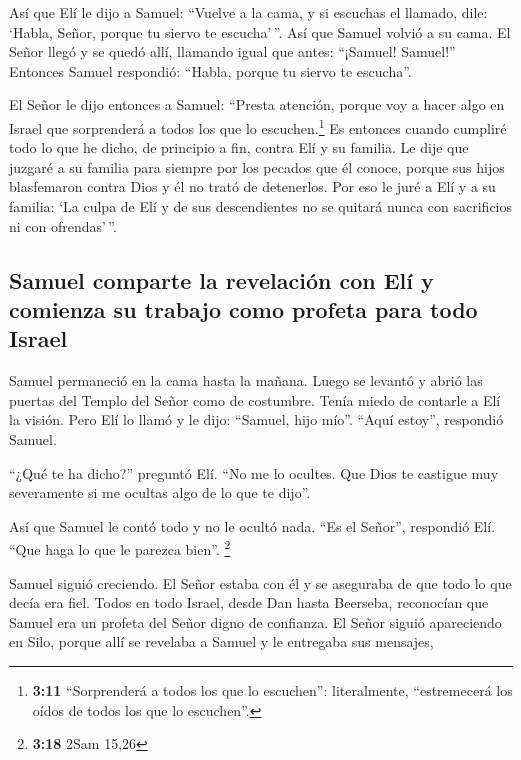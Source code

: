  Así que Elí le dijo a Samuel: ``Vuelve a la cama, y si
escuchas el llamado, dile: `Habla, Señor, porque tu siervo te
escucha'\,''. Así que Samuel volvió a su cama.  El Señor
llegó y se quedó allí, llamando igual que antes: ``¡Samuel! Samuel!''
Entonces Samuel respondió: ``Habla, porque tu siervo te escucha''.

 El Señor le dijo entonces a Samuel: ``Presta atención,
porque voy a hacer algo en Israel que sorprenderá a todos los que lo
escuchen.\footnote{\textbf{3:11} ``Sorprenderá a todos los que lo
  escuchen'': literalmente, ``estremecerá los oídos de todos los que lo
  escuchen''.}  Es entonces cuando cumpliré todo lo que
he dicho, de principio a fin, contra Elí y su familia. 
Le dije que juzgaré a su familia para siempre por los pecados que él
conoce, porque sus hijos blasfemaron contra Dios y él no trató de
detenerlos.  Por eso le juré a Elí y a su familia: `La
culpa de Elí y de sus descendientes no se quitará nunca con sacrificios
ni con ofrendas'\,''.

\hypertarget{samuel-comparte-la-revelaciuxf3n-con-eluxed-y-comienza-su-trabajo-como-profeta-para-todo-israel}{%
\subsection{Samuel comparte la revelación con Elí y comienza su trabajo
como profeta para todo
Israel}\label{samuel-comparte-la-revelaciuxf3n-con-eluxed-y-comienza-su-trabajo-como-profeta-para-todo-israel}}

 Samuel permaneció en la cama hasta la mañana. Luego se
levantó y abrió las puertas del Templo del Señor como de costumbre.
Tenía miedo de contarle a Elí la visión.  Pero Elí lo
llamó y le dijo: ``Samuel, hijo mío''. ``Aquí estoy'', respondió Samuel.

 ``¿Qué te ha dicho?'' preguntó Elí. ``No me lo ocultes.
Que Dios te castigue muy severamente si me ocultas algo de lo que te
dijo''.

 Así que Samuel le contó todo y no le ocultó nada. ``Es
el Señor'', respondió Elí. ``Que haga lo que le parezca bien''.
\footnote{\textbf{3:18} 2Sam 15,26}

 Samuel siguió creciendo. El Señor estaba con él y se
aseguraba de que todo lo que decía era fiel.  Todos en
todo Israel, desde Dan hasta Beerseba, reconocían que Samuel era un
profeta del Señor digno de confianza.  El Señor siguió
apareciendo en Silo, porque allí se revelaba a Samuel y le entregaba sus
mensajes,

